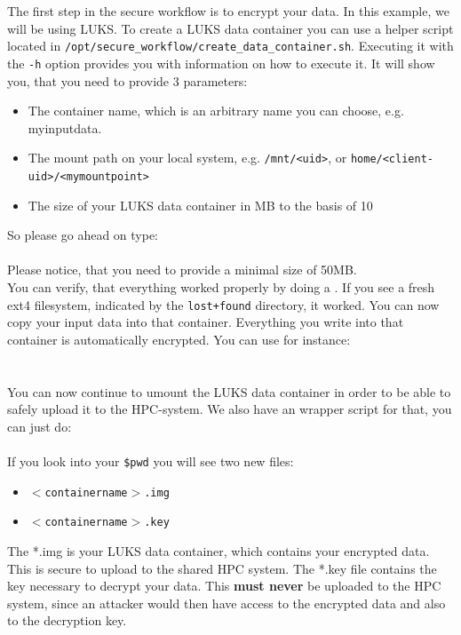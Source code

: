 \documentclass[paper=a4]{scrartcl}
\begin{document}
The first step in the secure workflow is to encrypt your data. 
In this example, we will be using LUKS. 
To create a LUKS data container you can use a helper script located in \texttt{/opt/secure\_workflow/create\_data\_container.sh}. 
Executing it with the \texttt{-h} option provides you with information on how to execute it. 
It will show you, that you need to provide 3 parameters: 
\begin{itemize}
	\item The container name, which is an arbitrary name you can choose, e.g. myinputdata.
	\item The mount path on your local system, e.g. \texttt{/mnt/<uid>}, or \texttt{home/<client-uid>/<mymountpoint>}
	\item The size of your LUKS data container in MB to the basis of 10
\end{itemize}
So please go ahead on type: \\
 \\
Please notice, that you need to provide a minimal size of 50MB. \\
You can verify, that everything worked properly by doing a . 
If you see a fresh ext4 filesystem, indicated by the \texttt{lost+found} directory, it worked. 
You can now copy your input data into that container. 
Everything you write into that container is automatically encrypted. 
You can use for instance: \\
 \\
\\
You can now continue to umount the LUKS data container in order to be able to safely upload it to the HPC-system. 
We also have an wrapper script for that, you can just do: \\
\\
If you look into your \texttt{\$pwd} you will see two new files:
\begin{itemize}
	\item \texttt{$<$containername$>$.img}
	\item \texttt{$<$containername$>$.key}
\end{itemize}
The *.img is your LUKS data container, which contains your encrypted data. This is secure to upload to the shared HPC system. 
The *.key file contains the key necessary to decrypt your data. This \textbf{must never} be uploaded to the HPC system, since an attacker would then have access to the encrypted data and also to the decryption key. 
\end{document}

